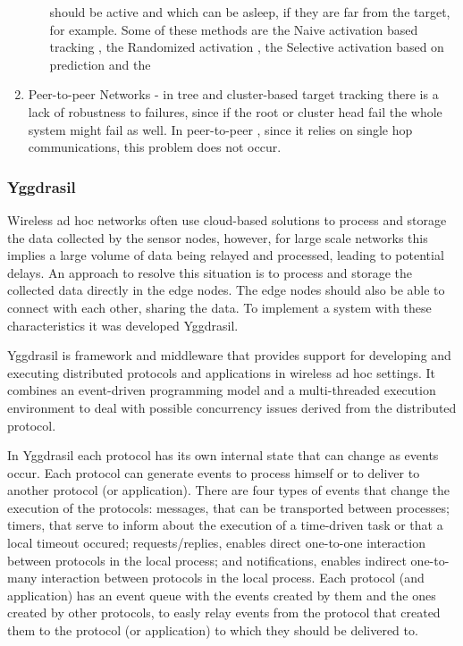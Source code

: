 \begin{enumerate}
\begin{enumerate}
                        should be active and which can be asleep, if they are far from the
                        target, for example. Some of these methods are the Naive activation
                        based tracking \cite{Pattem2003}, the Randomized activation \cite{Bisnik2006},
                        the Selective activation based on prediction \cite{Ramya2012} and the
                         \cite{Zahedi2010}
            \end{enumerate}
      \item Peer-to-peer Networks - in tree and cluster-based target tracking there is a lack of
            robustness to failures, since if the root or cluster head fail the whole system
            might fail as well. In peer-to-peer , since it relies on single
            hop communications, this problem does not occur.
\end{enumerate}


\subsubsection{Yggdrasil}
\label{subsubsection:Yggdrasil}
Wireless ad hoc networks often use cloud-based solutions to process and storage the data
collected by the sensor nodes, however, for large scale networks this implies a large volume
of data being relayed and processed, leading to potential delays. An approach to resolve this
situation is to process and storage the collected data directly in the edge nodes. The edge
nodes should also be able to connect with each other, sharing the data. To implement a system
with these characteristics it was developed Yggdrasil.

Yggdrasil \cite{Costa2018} is framework and middleware that provides support for developing
and executing distributed protocols and applications in wireless ad hoc settings. It combines
an event-driven programming model and a multi-threaded execution environment to deal with
possible concurrency issues derived from the distributed protocol.

In Yggdrasil each protocol has its own internal state that can change as events occur. Each
protocol can generate events to process himself or to deliver to another protocol (or
application). There are four types of events that change the execution of the protocols:
messages, that can be transported between processes; timers, that serve to inform about the
execution of a time-driven task or that a local timeout occured; requests/replies, enables
direct one-to-one interaction between protocols in the local process; and notifications,
enables indirect one-to-many interaction between protocols in the local process. Each protocol
(and application) has an event queue with the events created by them and the ones created by
other protocols, to easly relay events from the protocol that created them to the protocol (or
application) to which they should be delivered to.



